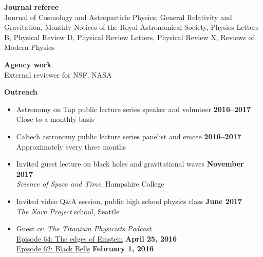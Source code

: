 \documentclass[margin,line]{res}
\begin{document}
\begin{resume}
{\bf Journal referee}
\vspace*{.05in}\\
\hspace*{1em}
Journal of Cosmology and Astroparticle Physics,
General Relativity and Gravitation,
Monthly Notices of the Royal Astronomical Society,
Physics Letters B,
Physical Review D,
Physical Review Letters,
Physical Review X,
Reviews of Modern Physics

{\bf Agency work}
\vspace*{.05in}\\
\hspace*{1em}
External reviewer for NSF, NASA

{\bf Outreach}
\vspace*{.05in}
\begin{itemize}
\item[] Astronomy on Tap public lecture series speaker and volunteer
  \hfill {\bf 2016--2017} \\
\hspace*{1em} Close to a monthly basis

\item[] Caltech astronomy public lecture series panelist and emcee
        \hfill {\bf 2016--2017} \\
\hspace*{1em} Approximately every three months \\

\item[] Invited guest lecture on black holes and gravitational waves \hfill {\bf November 2017} \\
\hspace*{1em} {\it Science of Space and Time}, Hampshire College

\item[] Invited video Q\&A session, public high school physics class \hfill {\bf June 2017} \\
\hspace*{1em} {\it The Nova Project} school, Seattle \\

\item[] Guest on {\it The Titanium Physicists Podcast} \\
\hspace*{1em} \href{http://titaniumphysicists.brachiolopemedia.com/2016/04/25/episode-64-e-and-n-the-edges-of-einstein/}{Episode 64: The edges of Einstein}
\hfill
{\bf April 25, 2016} \\
\hspace*{1em} \href{http://titaniumphysicists.brachiolopemedia.com/2016/02/01/episode-62-black-bells-with-brent-knopf-and-matt-sheehy/}{Episode 62: Black Bells}
\hfill
{\bf February 1, 2016} \\


\end{itemize}
\end{resume}
\end{document}

